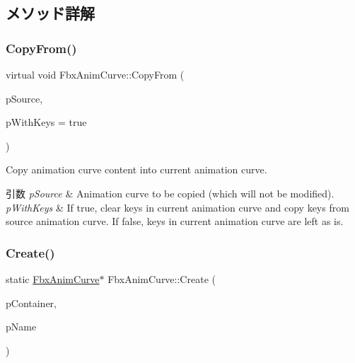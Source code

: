 \subsection{メソッド詳解}
\mbox{\label{class_fbx_anim_curve_a8e5b647af7ed54b53189fd9488e12f77}} 
\subsubsection{\texorpdfstring{Copy\+From()}{CopyFrom()}}
{\footnotesize\ttfamily virtual void Fbx\+Anim\+Curve\+::\+Copy\+From (\begin{DoxyParamCaption}\item[{\hyperlink{class_fbx_anim_curve}{Fbx\+Anim\+Curve} \&}]{p\+Source,  }\item[{bool}]{p\+With\+Keys = {\ttfamily true} }\end{DoxyParamCaption})\hspace{0.3cm}{\ttfamily [pure virtual]}}

Copy animation curve content into current animation curve. 
\begin{DoxyParams}{引数}
{\em p\+Source} & Animation curve to be copied (which will not be modified). \\
\hline
{\em p\+With\+Keys} & If {\ttfamily true}, clear keys in current animation curve and copy keys from source animation curve. If {\ttfamily false}, keys in current animation curve are left as is. \\
\hline
\end{DoxyParams}
\mbox{\label{class_fbx_anim_curve_ab0faf2c8c4a3d0fa8535da4a3eacb74a}} 
\subsubsection{\texorpdfstring{Create()}{Create()}}
{\footnotesize\ttfamily static \hyperlink{class_fbx_anim_curve}{Fbx\+Anim\+Curve}$\ast$ Fbx\+Anim\+Curve\+::\+Create (\begin{DoxyParamCaption}\item[{\hyperlink{class_fbx_scene}{Fbx\+Scene} $\ast$}]{p\+Container,  }\item[{const char $\ast$}]{p\+Name }\end{DoxyParamCaption})\hspace{0.3cm}{\ttfamily [static]}}

